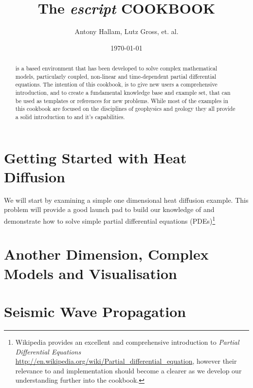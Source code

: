 \documentclass{manual}
\title{The \textit{escript} COOKBOOK}
\author{Antony Hallam, Lutz Gross, et. al.}
\date{\today}
\begin{document}
\maketitle



\begin{abstract}
\esc is a \pyt based environment that has been developed to solve complex mathematical models, particularly coupled, non-linear and time-dependent partial differential equations. The intention of this cookbook, is to give new \esc users a comprehensive introduction, and to create a fundamental knowledge base and example set, that can be used as templates or references for new problems. While most of the examples in this cookbook are focused on the disciplines of geophysics and geology they all provide a solid introduction to \esc and it's capabilities.
\end{abstract}
\tableofcontents

\newpage




\chapter{Getting Started with Heat Diffusion}
\label{CHAP HEAT DIFF}
We will start by examining a simple one dimensional heat diffusion example. This problem will provide a good launch pad to build our knowledge of \esc and demonstrate how to solve simple partial differential equations (PDEs)\footnote{Wikipedia provides an excellent and comprehensive introduction to \textit{Partial Differential Equations} \url{http://en.wikipedia.org/wiki/Partial_differential_equation}, however their relevance to \esc and implementation should become a clearer as we develop our understanding further into the cookbook.}



\chapter{Another Dimension, Complex Models and Visualisation}
\label{CHAP HEAT 2}



\chapter{Seismic Wave Propagation}



\end{document}
